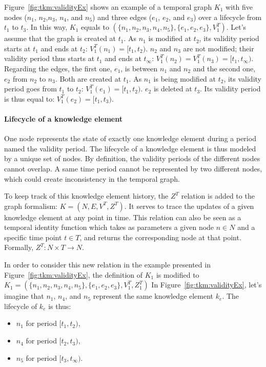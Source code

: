Figure~\ref{fig:tkm:validityEx} shows an example of a temporal graph $K_1$ with five nodes ($n_1$, $n_2$,$n_3$, $n_4$, and $n_5$) and three edges ($e_1$, $e_2$, and  $e_3$) over a lifecycle from $t_1$ to $t_3$.
In this way, $K_1$ equals to $(\{n_1, n_2, n_3, n_4, n_5\}, \{e_1, e_2, e_3\}, V^{T}_1)$.
Let's assume that the graph is created at $t_1$.
As $n_1$ is modified at $t_2$, its validity period starts at $t_1$ and ends at $t_2$: $V^{T}_1(n_1) = [t_1, t_2)$.
$n_2$ and $n_3$ are not modified; their validity period thus starts at $t_1$ and ends at $t_\infty$: $V^{T}_1(n_2) = V^{T}_1(n_3) = [t_1, t_\infty)$.
Regarding the edges, the first one, $e_1$, is between $n_1$ and $n_2$ and the second one, $e_2$ from $n_2$ to $n_3$.
Both are created at $t_1$.
As $n_1$ is being modified at $t_2$, its validity period goes from $t_1$ to $t_2$:  $V^{T}_1(e_1) = [t_1, t_2)$.
$e_2$ is deleted at $t_3$.
Its validity period is thus equal to: $V^{T}_1(e_2) = [t_1, t_3)$.

\paragraph{Lifecycle of a knowledge element}
One node represents the state of exactly one knowledge element during a period named the validity period.
The lifecycle of a knowledge element is thus modeled by a unique set of nodes.
By definition, the validity periods of the different nodes cannot overlap.
A same time period cannot be represented by two different nodes, which could create inconsistency in the temporal graph.

To keep track of this knowledge element history, the $Z^T$ relation is added to the graph formalism: $K = (N, E, V^T, Z^T)$.
It serves to trace the updates of a given knowledge element at any point in time. 
This relation can also be seen as a temporal identity function which takes as parameters a given node $n \in N$ and a specific time point $t \in T$, and returns the corresponding node at that point. 
Formally, $Z^T: N \times T \rightarrow N$. 

In order to consider this new relation in the example presented in Figure~\ref{fig:tkm:validityEx}, the definition of $K_1$ is modified to $K_1 = (\{n_1, n_2, n_3, n_4, n_5\}, \{e_1, e_2, e_3\}, V^{T}_1, Z^{T}_1)$
In Figure~\ref{fig:tkm:validityEx}, let's imagine that $n_1$, $n_4$, and $n_5$ represent the same knowledge element $k_e$.
The lifecycle of $k_e$ is thus:
\begin{itemize}
	\item $n_1$ for period $[t_1, t_2)$,
	\item $n_4$ for period $[t_2, t_3)$,
	\item $n_5$ for period $[t_3, t_\infty)$.
\end{itemize}

